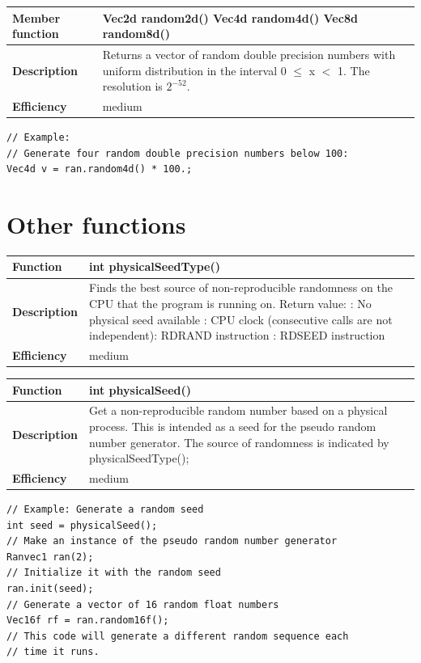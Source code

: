 \documentclass[11pt,a4paper,oneside,openright]{report}
\newcommand{\vspacebig}{\vspace{6mm}}
\begin{document}
\begin{tabular}{|p{30mm}|p{100mm}|}
\hline
\bfseries Member function & Vec2d random2d() \newline
Vec4d random4d() \newline
Vec8d random8d() \\ \hline
\bfseries Description & Returns a vector of random double precision numbers with uniform distribution in the interval 0 $\leq$ x $<$ 1. The resolution is $2^{-52}$.  \\ \hline
\bfseries Efficiency & medium \\ \hline
\end{tabular}
\begin{lstlisting}[frame=none]
// Example:
// Generate four random double precision numbers below 100:
Vec4d v = ran.random4d() * 100.;
\end{lstlisting}
\vspacebig


\section{Other functions}\label{OtherFunctions}

\begin{tabular}{|p{30mm}|p{100mm}|}
\hline
\bfseries Function & int physicalSeedType()  \\ \hline
\bfseries Description & Finds the best source of non-reproducible randomness on the CPU that the program is running on. Return value: \newline
0:  No physical seed available \newline
1:  CPU clock (consecutive calls are not independent)\newline
2:  RDRAND instruction \newline
3:  RDSEED instruction   \\ \hline
\bfseries Efficiency & medium \\ \hline
\end{tabular}
\vspacebig

\begin{tabular}{|p{30mm}|p{100mm}|}
\hline
\bfseries Function & int physicalSeed()  \\ \hline
\bfseries Description & Get a non-reproducible random number based on a physical process. This is intended as a seed for the pseudo random number generator. The source of randomness is indicated by physicalSeedType();  \\ \hline
\bfseries Efficiency & medium \\ \hline
\end{tabular}
\begin{lstlisting}[frame=none]
// Example: Generate a random seed
int seed = physicalSeed();
// Make an instance of the pseudo random number generator
Ranvec1 ran(2);
// Initialize it with the random seed
ran.init(seed);
// Generate a vector of 16 random float numbers
Vec16f rf = ran.random16f();
// This code will generate a different random sequence each
// time it runs.
\end{lstlisting}
\vspacebig
\end{document}

